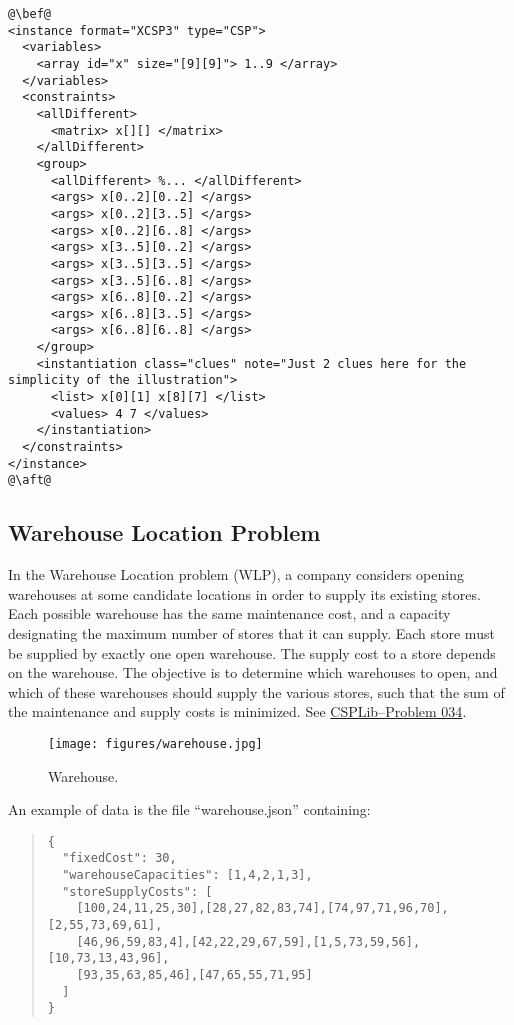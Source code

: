 \documentclass[10pt]{article}
\begin{document}
\begin{lstlisting}
@\bef@
<instance format="XCSP3" type="CSP">
  <variables>
    <array id="x" size="[9][9]"> 1..9 </array>
  </variables>
  <constraints>
    <allDifferent>
      <matrix> x[][] </matrix>
    </allDifferent>
    <group>
      <allDifferent> %... </allDifferent>
      <args> x[0..2][0..2] </args>
      <args> x[0..2][3..5] </args>
      <args> x[0..2][6..8] </args>
      <args> x[3..5][0..2] </args>
      <args> x[3..5][3..5] </args>
      <args> x[3..5][6..8] </args>
      <args> x[6..8][0..2] </args>
      <args> x[6..8][3..5] </args>
      <args> x[6..8][6..8] </args>
    </group>
    <instantiation class="clues" note="Just 2 clues here for the simplicity of the illustration">
      <list> x[0][1] x[8][7] </list>
      <values> 4 7 </values>
    </instantiation>
  </constraints>
</instance>
@\aft@
\end{lstlisting}


\subsection{Warehouse Location Problem}

In the Warehouse Location problem (WLP), a company considers opening warehouses at some candidate locations in order to supply its existing stores.
Each possible warehouse has the same maintenance cost, and a capacity designating the maximum number of stores that it can supply.
Each store must be supplied by exactly one open warehouse.
The supply cost to a store depends on the warehouse.
The objective is to determine which warehouses to open, and which of these warehouses should supply the various stores, such that the sum of the maintenance and supply costs is minimized.
See \href{http://csplib.org/Problems/prob034/}{CSPLib--Problem 034}.

\begin{figure}[h]
\begin{center}
  \texttt{[image: figures/warehouse.jpg]}
\end{center}
\caption{Warehouse.\label{fig:warehouse}}
\end{figure}

An example of data is the file ``warehouse.json'' containing:

{\small
  \begin{quote}
\begin{verbatim}
{
  "fixedCost": 30,
  "warehouseCapacities": [1,4,2,1,3],
  "storeSupplyCosts": [
    [100,24,11,25,30],[28,27,82,83,74],[74,97,71,96,70],[2,55,73,69,61],
    [46,96,59,83,4],[42,22,29,67,59],[1,5,73,59,56],[10,73,13,43,96],
    [93,35,63,85,46],[47,65,55,71,95]
  ]
}
\end{verbatim}
\end{quote}
}
\end{document}
